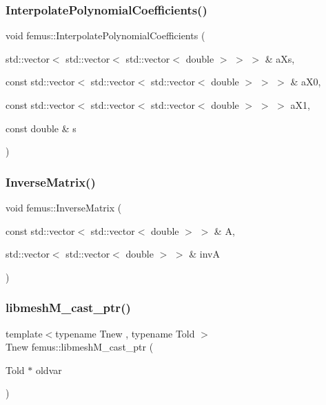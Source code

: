 \subsubsection{\texorpdfstring{Interpolate\+Polynomial\+Coefficients()}{InterpolatePolynomialCoefficients()}}
{\footnotesize\ttfamily void femus\+::\+Interpolate\+Polynomial\+Coefficients (\begin{DoxyParamCaption}\item[{std\+::vector$<$ std\+::vector$<$ std\+::vector$<$ double $>$ $>$ $>$ \&}]{a\+Xs,  }\item[{const std\+::vector$<$ std\+::vector$<$ std\+::vector$<$ double $>$ $>$ $>$ \&}]{a\+X0,  }\item[{const std\+::vector$<$ std\+::vector$<$ std\+::vector$<$ double $>$ $>$ $>$}]{a\+X1,  }\item[{const double \&}]{s }\end{DoxyParamCaption})}

\mbox{\label{namespacefemus_a576a658153a52c951f9f9fca3dd054ac}} 
\subsubsection{\texorpdfstring{Inverse\+Matrix()}{InverseMatrix()}}
{\footnotesize\ttfamily void femus\+::\+Inverse\+Matrix (\begin{DoxyParamCaption}\item[{const std\+::vector$<$ std\+::vector$<$ double $>$ $>$ \&}]{A,  }\item[{std\+::vector$<$ std\+::vector$<$ double $>$ $>$ \&}]{invA }\end{DoxyParamCaption})}

\mbox{\label{namespacefemus_a5b274d783d791a1dd5e8ee71d520e8f0}} 
\subsubsection{\texorpdfstring{libmesh\+M\+\_\+cast\+\_\+ptr()}{libmeshM\_cast\_ptr()}}
{\footnotesize\ttfamily template$<$typename Tnew , typename Told $>$ \\
Tnew femus\+::libmesh\+M\+\_\+cast\+\_\+ptr (\begin{DoxyParamCaption}\item[{Told $\ast$}]{oldvar }\end{DoxyParamCaption})\hspace{0.3cm}{\ttfamily [inline]}}

